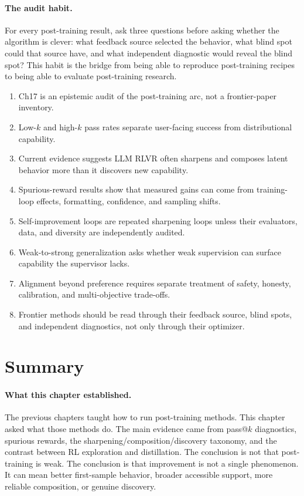 \paragraph{The audit habit.} For every post-training result, ask three questions before asking whether the algorithm is clever: what feedback source selected the behavior, what blind spot could that source have, and what independent diagnostic would reveal the blind spot? This habit is the bridge from being able to reproduce post-training recipes to being able to evaluate post-training research.



\begin{takeaways}
\begin{enumerate}
  \item Ch17 is an epistemic audit of the post-training arc, not a frontier-paper inventory.
  \item Low-$k$ and high-$k$ pass rates separate user-facing success from distributional capability.
  \item Current evidence suggests LLM RLVR often sharpens and composes latent behavior more than it discovers new capability.
  \item Spurious-reward results show that measured gains can come from training-loop effects, formatting, confidence, and sampling shifts.
  \item Self-improvement loops are repeated sharpening loops unless their evaluators, data, and diversity are independently audited.
  \item Weak-to-strong generalization asks whether weak supervision can surface capability the supervisor lacks.
  \item Alignment beyond preference requires separate treatment of safety, honesty, calibration, and multi-objective trade-offs.
  \item Frontier methods should be read through their feedback source, blind spots, and independent diagnostics, not only through their optimizer.
\end{enumerate}
\end{takeaways}


\section*{Summary}

\paragraph{What this chapter established.} The previous chapters taught how to run post-training methods. This chapter asked what those methods do. The main evidence came from pass@$k$ diagnostics, spurious rewards, the sharpening/composition/discovery taxonomy, and the contrast between RL exploration and distillation. The conclusion is not that post-training is weak. The conclusion is that improvement is not a single phenomenon. It can mean better first-sample behavior, broader accessible support, more reliable composition, or genuine discovery.

